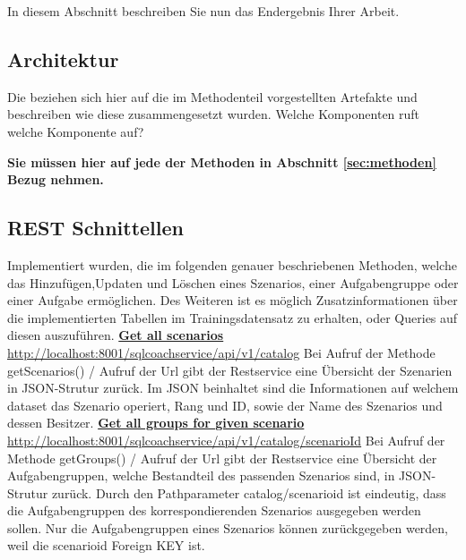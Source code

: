 \documentclass[fleqn,10pt,ngerman]{SelfArx}
\begin{document}
	In diesem Abschnitt beschreiben Sie nun das Endergebnis Ihrer Arbeit. 
	\subsection{Architektur}
	
	Die beziehen sich hier auf die im Methodenteil vorgestellten Artefakte und beschreiben wie diese zusammengesetzt wurden. Welche Komponenten ruft welche Komponente auf? 
	
	\textbf{{Sie müssen hier auf jede der Methoden in Abschnitt} \ref{sec:methoden} Bezug nehmen.}
	
	
	\subsection{REST Schnittellen}
	Implementiert wurden, die im folgenden genauer beschriebenen Methoden, welche das Hinzufügen,Updaten und Löschen eines Szenarios, einer Aufgabengruppe oder einer Aufgabe ermöglichen. 
	Des Weiteren ist es möglich Zusatzinformationen über die implementierten Tabellen im Trainingsdatensatz zu erhalten, oder Queries auf diesen auszuführen.
	\newline
	\newline
	\noindent
	\underline{\textbf{Get all scenarios}}\newline
	\underline{http://localhost:8001/sqlcoachservice/api/v1/catalog}\newline
	\noindent Bei Aufruf der Methode getScenarios() / Aufruf der Url gibt der Restservice eine Übersicht der Szenarien in JSON-Strutur zurück. 
	Im JSON beinhaltet sind die Informationen auf welchem dataset das Szenario operiert, Rang und ID, sowie der Name des Szenarios und dessen Besitzer.
	\newline
	\newline
	\underline{\textbf{Get all groups for given scenario}}\newline
	\underline{http://localhost:8001/sqlcoachservice/api/v1/catalog}\newline\underline{/{scenarioId}}\newline
	Bei Aufruf der Methode getGroups() / Aufruf der Url gibt der Restservice eine Übersicht der Aufgabengruppen, welche Bestandteil des passenden Szenarios sind, in JSON-Strutur zurück. Durch den Pathparameter catalog/{scenarioid} ist eindeutig, dass die Aufgabengruppen des korrespondierenden Szenarios ausgegeben werden sollen. Nur die Aufgabengruppen eines Szenarios können zurückgegeben werden, weil die scenarioid  Foreign KEY ist.
\end{document}
